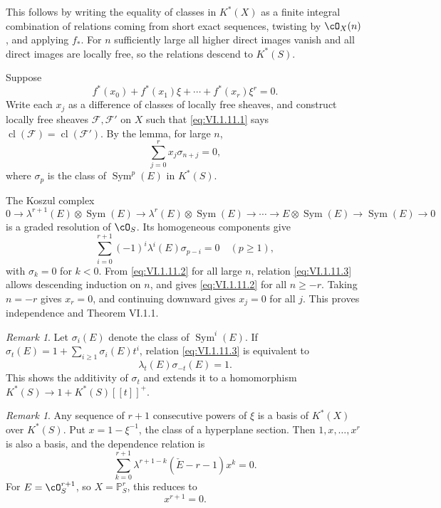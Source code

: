 \documentclass[11pt]{article}
\theoremstyle{plain}
\theoremstyle{definition}
\theoremstyle{remark}
\newtheorem{remark}[theorem]{Remark}
\DeclareMathOperator{\cl}{cl}
\providecommand{\Sym}{\operatorname{Sym}}
\begin{document}
This follows by writing the equality of classes in $K^*(X)$ as a finite integral combination of relations coming from short exact sequences, twisting by $\cO_X(n)$, and applying $f_*$. For $n$ sufficiently large all higher direct images vanish and all direct images are locally free, so the relations descend to $K^*(S)$.

Suppose
\begin{equation}\label{eq:VI.1.11.1}
f^*(x_0)+f^*(x_1)\xi+\cdots+f^*(x_r)\xi^r=0.
\end{equation}
Write each $x_j$ as a difference of classes of locally free sheaves, and construct locally free sheaves $\mathcal F,\mathcal F'$ on $X$ such that \eqref{eq:VI.1.11.1} says $\cl(\mathcal F)=\cl(\mathcal F')$. By the lemma, for large $n$,
\begin{equation}\label{eq:VI.1.11.2}
\sum_{j=0}^{r}x_j\sigma_{n+j}=0,
\end{equation}
where $\sigma_p$ is the class of $\Sym^p(E)$ in $K^*(S)$.

The Koszul complex
\[
0\to \lambda^{r+1}(E)\otimes\Sym(E)\to\lambda^r(E)\otimes\Sym(E)\to\cdots\to E\otimes\Sym(E)\to\Sym(E)\to 0
\]
is a graded resolution of $\cO_S$. Its homogeneous components give
\begin{equation}\label{eq:VI.1.11.3}
\sum_{i=0}^{r+1}(-1)^i\lambda^i(E)\sigma_{p-i}=0\quad(p\geq 1),
\end{equation}
with $\sigma_k=0$ for $k<0$. From \eqref{eq:VI.1.11.2} for all large $n$, relation \eqref{eq:VI.1.11.3} allows descending induction on $n$, and gives \eqref{eq:VI.1.11.2} for all $n\geq -r$. Taking $n=-r$ gives $x_r=0$, and continuing downward gives $x_j=0$ for all $j$. This proves independence and Theorem VI.1.1.

\begin{remark}
Let $\sigma_i(E)$ denote the class of $\Sym^i(E)$. If $\sigma_t(E)=1+\sum_{i\geq 1}\sigma_i(E)t^i$, relation \eqref{eq:VI.1.11.3} is equivalent to
\begin{equation}\label{eq:VI.1.12.1}
\lambda_t(E)\sigma_{-t}(E)=1.
\end{equation}
This shows the additivity of $\sigma_t$ and extends it to a homomorphism $K^*(S)\to 1+K^*(S)[[t]]^+$.
\end{remark}

\begin{remark}
Any sequence of $r+1$ consecutive powers of $\xi$ is a basis of $K^*(X)$ over $K^*(S)$. Put $x=1-\xi^{-1}$, the class of a hyperplane section. Then $1,x,\ldots,x^r$ is also a basis, and the dependence relation is
\begin{equation}\label{eq:VI.1.13.1}
\sum_{k=0}^{r+1}\lambda^{r+1-k}(\check E-r-1)x^k=0.
\end{equation}
For $E=\cO_S^{r+1}$, so $X=\mathbb P^r_S$, this reduces to
\begin{equation}\label{eq:VI.1.13.2}
x^{r+1}=0.
\end{equation}
\end{remark}
\end{document}
